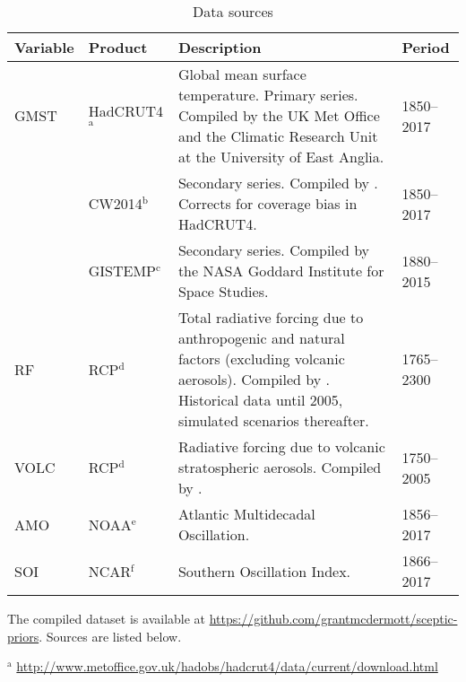 \documentclass[smallextended]{svjour3}       %
\begin{document}
\begin{table}[t]
    \caption{Data sources}
    \label{tab:sources}
    \small
    \centering
    \begin{threeparttable}
        \begin{tabularx}{\linewidth}{ l l X l}
            \toprule
            Variable    & Product & Description & Period \\
            \midrule
            GMST    &   HadCRUT4$^\text{a}$ &   Global mean surface temperature. Primary series. Compiled by the UK Met Office and the Climatic Research Unit at the University of East Anglia. & 1850--2017 \\
                        &   CW2014$^\text{b}$       &   Secondary series. Compiled by \cite{cowtan2014coverage,cowtan2014update}. Corrects for coverage bias in HadCRUT4.   & 1850--2017 \\
                        & GISTEMP$^\text{c}$        & Secondary series. Compiled by the NASA Goddard Institute for Space Studies.                                           &   1880--2015 \\
            RF      & RCP$^\text{d}$                & Total radiative forcing due to anthropogenic and natural factors (excluding volcanic aerosols). Compiled by \cite{meinshausen2011rcp}. Historical data until 2005, simulated scenarios thereafter.                & 1765--2300 \\
            VOLC        & RCP$^\text{d}$                & Radiative forcing due to volcanic stratospheric aerosols. Compiled by \cite{meinshausen2011rcp}.                                                                                          & 1750--2005 \\
            AMO     & NOAA$^\text{e}$               & Atlantic Multidecadal Oscillation.                                            &   1856--2017 \\
            SOI     & NCAR$^\text{f}$               & Southern Oscillation Index.                                                           &   1866--2017 \\
            \bottomrule
        \end{tabularx}
    \begin{tablenotes}
        \footnotesize
            \item The compiled dataset is available at \url{https://github.com/grantmcdermott/sceptic-priors}. Sources are listed below.
            \item $^\text{a}$ \url{http://www.metoffice.gov.uk/hadobs/hadcrut4/data/current/download.html}

\end{tablenotes}
\end{threeparttable}
\end{table}
\end{document}
